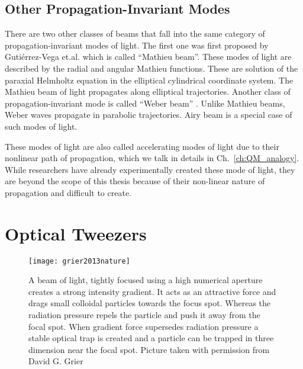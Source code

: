 \subsection{Other Propagation-Invariant Modes}

There are two other classes of beams that fall into the same category of propagation-invariant modes of light. The first one was first proposed by Gutiérrez-Vega et.al. \cite{Gutierrez-Vega:00} which is called ``Mathieu beam''. These modes of light are described by the radial and angular Mathieu functions. These are solution of the paraxial Helmholtz equation in the elliptical cylindrical coordinate system. The Mathieu beam of light propagates along elliptical trajectories. Another class of propagation-invariant mode is called ``Weber beam'' \cite{Bandres_2013}. Unlike Mathieu beams, Weber waves propagate in parabolic trajectories. Airy beam is a special case of such modes of light.

These modes of light are also called accelerating modes of light due to their nonlinear path of propagation, which we talk in details in Ch.~\eqref{ch:QM_analogy}. While researchers have already experimentally created these mode of light, they are beyond the scope of this thesis because of their non-linear nature of propagation and difficult to create.

\section{Optical Tweezers}
\begin{figure}[t!]
  \centering
  \texttt{[image: grier2013nature]}
  \caption{A beam of light, tightly focused using a high numerical aperture creates a strong intensity gradient. It acts as an attractive force and drags small colloidal particles towards the focus spot. Whereas the radiation pressure repels the particle and push it away from the focal spot. When gradient force supersedes radiation pressure a stable optical trap is created and a particle can be trapped in three dimension near the focal spot. Picture taken with permission from David G. Grier \cite{grier2003nature}}
  \label{fig:Optical tweezers}
\end{figure}

